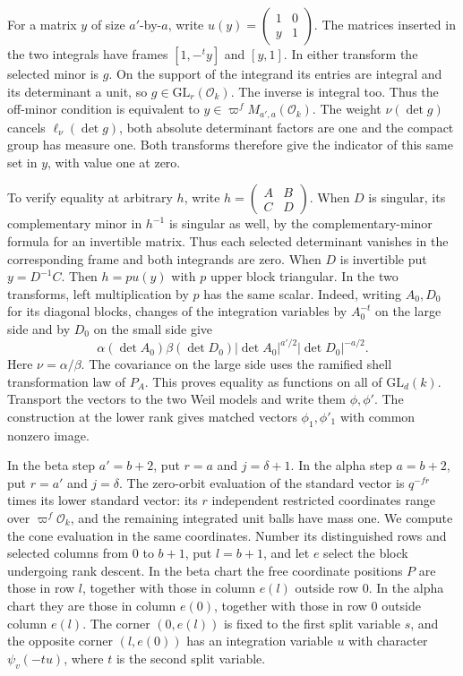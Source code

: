 For a matrix \(y\) of size \(a'\)-by-\(a\), write
\(u(y)=\left(\begin{smallmatrix}1&0\\y&1\end{smallmatrix}\right)\).
The matrices inserted in the two integrals have frames
\([1,-{}^ty]\) and \([y,1]\). In either transform the selected
minor is \(g\). On the support of the integrand its entries are
integral and its determinant a unit, so \(g\in\mathrm{GL}_r(\mathcal
O_k)\). The inverse is integral too. Thus the off-minor condition
is equivalent to \(y\in\varpi^f M_{a',a}(\mathcal O_k)\). The
weight \(\nu(\det g)\) cancels \(\ell_\nu(\det g)\), both absolute
determinant factors are one and the compact group has measure one.
Both transforms therefore give the indicator of this same set in
\(y\), with value one at zero.

To verify equality at arbitrary \(h\), write
\(h=\left(\begin{smallmatrix}A&B\\C&D\end{smallmatrix}\right)\).
When \(D\) is singular, its complementary minor in \(h^{-1}\)
is singular as well, by the complementary-minor formula for an
invertible matrix. Thus each selected determinant vanishes in the
corresponding frame and both integrands are zero. When \(D\) is
invertible put \(y=D^{-1}C\). Then \(h=p u(y)\) with \(p\) upper
block triangular. In the two transforms, left multiplication by \(p\)
has the same scalar. Indeed, writing \(A_0,D_0\) for its diagonal
blocks, changes of the integration variables by \(A_0^{-t}\) on
the large side and by \(D_0\) on the small side give
\[
 \alpha(\det A_0)\beta(\det D_0)
            |\det A_0|^{a'/2}|\det D_0|^{-a/2}.
\]
Here \(\nu=\alpha/\beta\). The covariance on the large side uses
the ramified shell transformation law of \(P_A\).
This proves equality as functions on all of \(\mathrm{GL}_d(k)\).
Transport the vectors to the two Weil models and write them
\(\phi,\phi'\). The construction at the lower rank gives matched
vectors \(\phi_1,\phi'_1\) with common nonzero image.

In the beta step \(a'=b+2\), put \(r=a\) and \(j=\delta+1\).
In the alpha step \(a=b+2\), put \(r=a'\) and \(j=\delta\). The
zero-orbit evaluation of the standard vector is \(q^{-fr}\) times
its lower standard vector: its \(r\) independent restricted
coordinates range over \(\varpi^f\mathcal O_k\), and the remaining
integrated unit balls have mass one. We compute the cone evaluation
in the same coordinates. Number its distinguished rows and selected
columns from \(0\) to \(b+1\), put \(l=b+1\), and let \(e\) select
the block undergoing rank descent. In the beta chart the free
coordinate positions \(P\) are those in row \(l\), together with
those in column \(e(l)\) outside row \(0\). In the alpha chart
they are those in column \(e(0)\), together with those in row \(0\)
outside column \(e(l)\). The corner \((0,e(l))\) is fixed to the
first split variable \(s\), and the opposite corner \((l,e(0))\)
has an integration variable \(u\) with character \(\psi_v(-tu)\),
where \(t\) is the second split variable.

